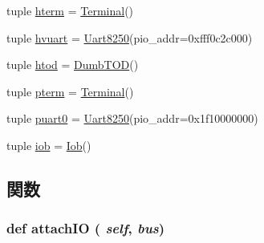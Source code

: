 \begin{DoxyCompactItemize}
\item 
tuple \hyperlink{classT1000_1_1T1000_a6d899b7544626dab4ba02bc89ed95d75}{hterm} = \hyperlink{classTerminal}{Terminal}()
\item 
tuple \hyperlink{classT1000_1_1T1000_a3a13779e41d1cff39c0ed34996932c9c}{hvuart} = \hyperlink{classUart8250}{Uart8250}(pio\_\-addr=0xfff0c2c000)
\item 
tuple \hyperlink{classT1000_1_1T1000_a50e265cc7986e7e4eb153fdb6aaa5438}{htod} = \hyperlink{classT1000_1_1DumbTOD}{DumbTOD}()
\item 
tuple \hyperlink{classT1000_1_1T1000_a4a5dca31994bd39c47b8e64cd61e2bb5}{pterm} = \hyperlink{classTerminal}{Terminal}()
\item 
tuple \hyperlink{classT1000_1_1T1000_a3e93dc0da948aa69a8c3abdf7e1b9ff1}{puart0} = \hyperlink{classUart8250}{Uart8250}(pio\_\-addr=0x1f10000000)
\item 
tuple \hyperlink{classT1000_1_1T1000_ac70fa525ba610375c986dad16b8195d9}{iob} = \hyperlink{classT1000_1_1Iob}{Iob}()
\end{DoxyCompactItemize}


\subsection{関数}
\hypertarget{classT1000_1_1T1000_ac750675f6d6de3ad52f8c5b03ee45a65}{
\subsubsection[{attachIO}]{\setlength{\rightskip}{0pt plus 5cm}def attachIO ( {\em self}, \/   {\em bus})}}
\label{classT1000_1_1T1000_ac750675f6d6de3ad52f8c5b03ee45a65}



